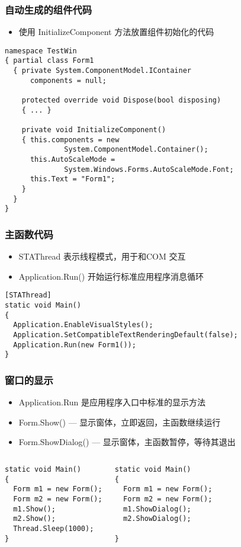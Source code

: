 \begin{frame}[fragile]
\frametitle{自动生成的组件代码}
\begin{itemize}
\item 使用 InitializeComponent 方法放置组件初始化的代码
\end{itemize}
\begin{lstlisting}
namespace TestWin
{ partial class Form1
  { private System.ComponentModel.IContainer 
      components = null;

    protected override void Dispose(bool disposing)
    { ... }

    private void InitializeComponent()
    { this.components = new 
              System.ComponentModel.Container();
      this.AutoScaleMode = 
              System.Windows.Forms.AutoScaleMode.Font;
      this.Text = "Form1";
    }
  }
}
\end{lstlisting}
\end{frame}

\begin{frame}[fragile]
\frametitle{主函数代码}
\begin{itemize}
\item STAThread 表示线程模式，用于和COM 交互
\item Application.Run() 开始运行标准应用程序消息循环
\end{itemize}
\begin{lstlisting}
[STAThread]
static void Main()
{
  Application.EnableVisualStyles();
  Application.SetCompatibleTextRenderingDefault(false);
  Application.Run(new Form1());
}
\end{lstlisting}
\end{frame}

\begin{frame}[fragile]
\frametitle{窗口的显示}
\begin{itemize}
\item Application.Run 是应用程序入口中标准的显示方法
\item Form.Show() --- 显示窗体，立即返回，主函数继续运行
\item Form.ShowDialog() --- 显示窗体，主函数暂停，等待其退出
\end{itemize}
\begin{columns}
\begin{lstlisting}
static void Main()
{
  Form m1 = new Form();
  Form m2 = new Form();
  m1.Show();
  m2.Show();
  Thread.Sleep(1000);
}
\end{lstlisting}
\begin{lstlisting}
static void Main()
{
  Form m1 = new Form();
  Form m2 = new Form();
  m1.ShowDialog();
  m2.ShowDialog();

}

\end{lstlisting}
\end{columns}
\end{frame}


